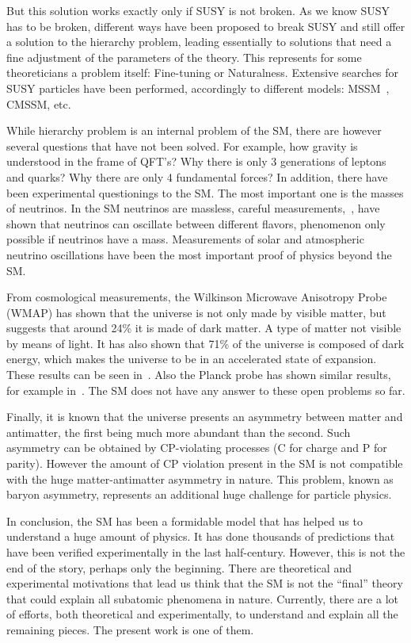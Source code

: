 But this solution works exactly only if SUSY is not broken. As we know SUSY has to be broken, different ways have been proposed to break SUSY and still offer a solution to the hierarchy problem, leading essentially to solutions that need a fine adjustment of the parameters of the theory. This represents for some theoreticians a problem itself: Fine-tuning or Naturalness. Extensive searches for SUSY particles have been performed, accordingly to different models: MSSM~\cite{Khachatryan:2014wca,Aad:2014vgg}, CMSSM, etc.

While hierarchy problem is an internal problem of the SM, there are however several questions that have not been solved. For example, how gravity is understood in the frame of QFT's? Why there is only 3 generations of leptons and quarks? Why there are only 4 fundamental forces? In addition, there have been experimental questionings to the SM. The most important one is the masses of neutrinos. In the SM neutrinos are massless, careful measurements,~\cite{Ashie:2004mr, Weinheimer:2013hya}, have shown that neutrinos can oscillate between different flavors, phenomenon only possible if neutrinos have a mass. Measurements of solar and atmospheric neutrino oscillations have been the most important proof of physics beyond the SM. 

From cosmological measurements, the Wilkinson Microwave Anisotropy Probe (WMAP) has shown that the universe is not only made by visible matter, but suggests that around 24\% it is made of dark matter. A type of matter not visible by means of light. It has also shown that 71\% of the universe is composed of dark energy, which makes the universe to be in an accelerated state of expansion. These results can be seen in~\cite{2013ApJS..208...20B, 2013ApJS..208...19H}. Also the Planck probe has shown similar results, for example in~\cite{Planck:2015xua}. The SM does not have any answer to these open problems so far. 

Finally, it is known that the universe presents an asymmetry between matter and antimatter, the first being much more abundant than the second. Such asymmetry can be obtained by CP-violating processes (C for charge and P for parity). However the amount of CP violation present in the SM is not compatible with the huge matter-antimatter asymmetry in nature. This problem, known as baryon asymmetry, represents an additional huge challenge for particle physics. 

In conclusion, the SM has been a formidable model that has helped us to understand a huge amount of physics. It has done thousands of predictions that have been verified experimentally in the last half-century. However, this is not the end of the story, perhaps only the beginning. There are theoretical and experimental motivations that lead us think that the SM is not the ``final'' theory that could explain all subatomic phenomena in nature. Currently, there are a lot of efforts, both theoretical and experimentally, to understand and explain all the remaining pieces. The present work is one of them.

